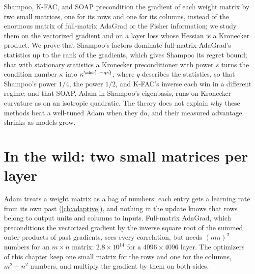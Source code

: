 
\begin{refsection}

\begin{chaptersummary}
Shampoo, K-FAC, and SOAP precondition the gradient of each weight matrix by two small matrices, one for its rows and one for its columns, instead of the enormous matrix of full-matrix AdaGrad or the Fisher information; we study them on the vectorized gradient and on a layer loss whose Hessian is a Kronecker product. We prove that Shampoo's factors dominate full-matrix AdaGrad's statistics up to the rank of the gradients, which gives Shampoo its regret bound; that with stationary statistics a Kronecker preconditioner with power $s$ turns the condition number $\kappa$ into $\kappa^{\abs{1-qs}}$, where $q$ describes the statistics, so that Shampoo's power $1/4$, the power $1/2$, and K-FAC's inverse each win in a different regime; and that SOAP, Adam in Shampoo's eigenbasis, runs on Kronecker curvature as on an isotropic quadratic. The theory does not explain why these methods beat a well-tuned Adam when they do, and their measured advantage shrinks as models grow.
\end{chaptersummary}

\section{In the wild: two small matrices per layer}\label{sec:kronecker:wild}

Adam treats a weight matrix as a bag of numbers: each entry gets a learning rate from its own past (\cref{ch:adaptive}), and nothing in the update knows that rows belong to output units and columns to inputs. Full-matrix AdaGrad, which preconditions the vectorized gradient by the inverse square root of the summed outer products of past gradients, sees every correlation, but needs $(mn)^2$ numbers for an $m\times n$ matrix: $2.8\times10^{14}$ for a $4096\times4096$ layer. The optimizers of this chapter keep one small matrix for the rows and one for the columns, $m^2+n^2$ numbers, and multiply the gradient by them on both sides.


\end{refsection}
